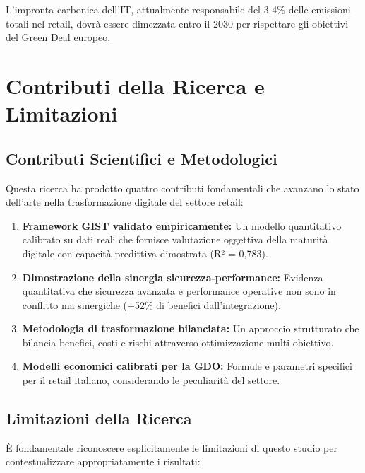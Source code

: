 L'impronta carbonica dell'IT, attualmente responsabile del 3-4\% delle emissioni totali nel retail, dovrà essere dimezzata entro il 2030 per rispettare gli obiettivi del Green Deal europeo.

\section{\texorpdfstring{\textbf{Contributi della Ricerca e Limitazioni}}{5.6 - Contributi della Ricerca e Limitazioni}}
\label{sec:5.6}

\subsection{\texorpdfstring{\textbf{Contributi Scientifici e Metodologici}}{5.6.1 - Contributi Scientifici e Metodologici}}
\label{subsec:5.6.1}

Questa ricerca ha prodotto quattro contributi fondamentali che avanzano lo stato dell'arte nella trasformazione digitale del settore retail:

\begin{enumerate}
\item \textbf{Framework GIST validato empiricamente:} Un modello quantitativo calibrato su dati reali che fornisce valutazione oggettiva della maturità digitale con capacità predittiva dimostrata (R² = 0,783).

\item \textbf{Dimostrazione della sinergia sicurezza-performance:} Evidenza quantitativa che sicurezza avanzata e performance operative non sono in conflitto ma sinergiche (+52\% di benefici dall'integrazione).

\item \textbf{Metodologia di trasformazione bilanciata:} Un approccio strutturato che bilancia benefici, costi e rischi attraverso ottimizzazione multi-obiettivo.

\item \textbf{Modelli economici calibrati per la GDO:} Formule e parametri specifici per il retail italiano, considerando le peculiarità del settore.
\end{enumerate}

\subsection{\texorpdfstring{\textbf{Limitazioni della Ricerca}}{5.6.2 - Limitazioni della Ricerca}}
\label{subsec:5.6.2}

È fondamentale riconoscere esplicitamente le limitazioni di questo studio per contestualizzare appropriatamente i risultati:

